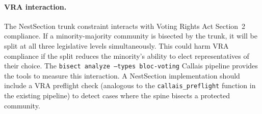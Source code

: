 \paragraph{VRA interaction.}
The NestSection trunk constraint interacts with Voting Rights Act
Section~2 compliance.  If a minority-majority community is bisected by the
trunk, it will be split at all three legislative levels simultaneously.  This
could harm VRA compliance if the split reduces the minority's ability to elect
representatives of their choice.  The \texttt{bisect analyze --types bloc-voting}
Callais pipeline provides the tools to measure this interaction.  A NestSection
implementation should include a VRA preflight check (analogous to the
\texttt{callais\_preflight} function in the existing pipeline) to detect cases
where the spine bisects a protected community.
